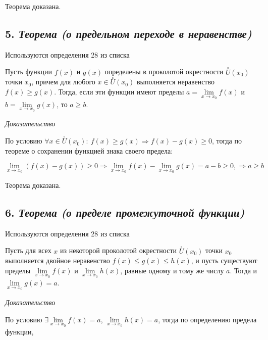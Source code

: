 Теорема доказана.
\newpage 
\subsection*{5. \textit{Теорема (о предельном переходе в неравенстве)}}
\begin{Quote2} 
\small\centering 

Используются определения 28 из списка \end{Quote2} 

Пусть функции $f(x)$ и $g(x)$ определены в проколотой окрестности $\overset{\circ}U(x_0)$ точки $x_0$, причем для любого $x \in \overset{\circ}U(x_0)$ выполняется неравенство $f(x) \geqslant g(x)$. Тогда, если эти функции имеют пределы $a = \lim\limits_{x \to x_0}f(x)$ и $b = \lim\limits_{x \to x_0}g(x)$, то $a \geqslant b$.
\vspace*{20pt} 

\textit{Доказательство}

По условию $\forall x \in \overset{\circ}U(x_0): \ f(x) \geqslant g(x) \Rightarrow f(x) - g(x) \geqslant 0$, тогда по теореме о сохранении функцией знака своего предела:

$$
\lim\limits_{x \to x_0}(f(x) - g(x)) \geqslant 0 \Rightarrow \lim\limits_{x \to x_0}f(x) - \lim\limits_{x \to x_0}g(x) = a - b \geqslant 0, \Rightarrow a \geqslant b
$$

Теорема доказана.
\newpage 
\subsection*{6. \textit{Теорема (о пределе промежуточной функции)}}
\begin{Quote2} 
\small\centering 

Используются определения 28 из списка \end{Quote2} 

Пусть для всех $x$ из некоторой проколотой окрестности $\overset{\circ}U(x_0)$ точки $x_0$ выполняется двойное неравенство $f(x) \leqslant g(x) \leqslant h(x)$, и пусть существуют пределы $\lim\limits_{x \to x_0}f(x)$ и $\lim\limits_{x \to x_0}h(x)$, равные одному и тому же числу $a$. Тогда и $\lim\limits_{x \to x_0}g(x) = a$.
\vspace*{20pt} 

\textit{Доказательство}

По условию $\exists \lim\limits_{x \to x_0}f(x) = a$, $\lim\limits_{x \to x_0}h(x) = a$, тогда по определению предела функции,

